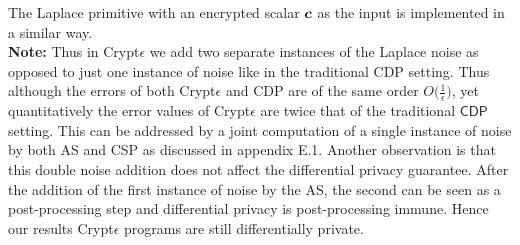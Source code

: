  The \textsf{Laplace} primitive with an encrypted scalar $\boldsymbol{c}$ as the input is implemented in a similar way.\\
{\textbf{Note:}} Thus in Crypt$\epsilon$ we add two separate instances of the Laplace noise as opposed to just one instance of noise like in the traditional \textsf{CDP} setting. Thus although the errors of both Crypt$\epsilon$ and \textsf{CDP} are of the same order $O\big(\frac{1}{\epsilon}\big)$, yet quantitatively the error values of Crypt$\epsilon$ are twice that of the traditional $\textsf{CDP}$ setting. This can be addressed by a joint computation of a single instance of noise by both \textsf{AS} and \textsf{CSP} as discussed in appendix E.1. Another observation is that this double noise addition does not affect the differential privacy guarantee. After the addition of the first instance of noise by the \textsf{AS}, the second can be seen as a post-processing step and differential privacy is post-processing immune. Hence our results Crypt$\epsilon$ programs are still differentially private.
